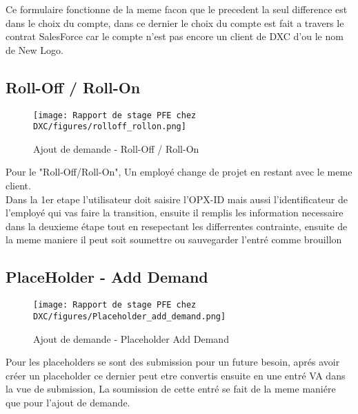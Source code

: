 Ce formulaire fonctionne de la meme facon que le precedent la seul difference est dans le choix du compte, dans ce dernier le choix du compte est fait a travers le contrat SalesForce car le compte n'est pas encore un client de DXC d'ou le nom de New Logo.

\subsection{Roll-Off / Roll-On}

\begin{figure}[H]
    \centering
    \texttt{[image: Rapport de stage PFE chez DXC/figures/rolloff\_rollon.png]}
    \caption{Ajout de demande - Roll-Off / Roll-On}
\end{figure}

Pour le "Roll-Off/Roll-On", Un employé change de projet en restant avec le meme client.
\\
Dans la 1er etape l'utilisateur doit saisire l'OPX-ID mais aussi l'identificateur de l'employé qui vas faire la transition, ensuite il remplis les information necessaire dans la deuxieme étape tout en resepectant les differrentes contrainte, ensuite de la meme maniere il peut soit soumettre ou sauvegarder l'entré comme brouillon

\subsection{PlaceHolder - Add Demand}

\begin{figure}[H]
    \centering
    \texttt{[image: Rapport de stage PFE chez DXC/figures/Placeholder\_add\_demand.png]}
    \caption{Ajout de demande - Placeholder Add Demand}
\end{figure}

Pour les placeholders se sont des submission pour un future besoin, aprés avoir créer un placeholder ce dernier peut etre convertis ensuite en une entré VA dans la vue de submission, La soumission de cette entré se fait de la meme maniére que pour l'ajout de demande. 


